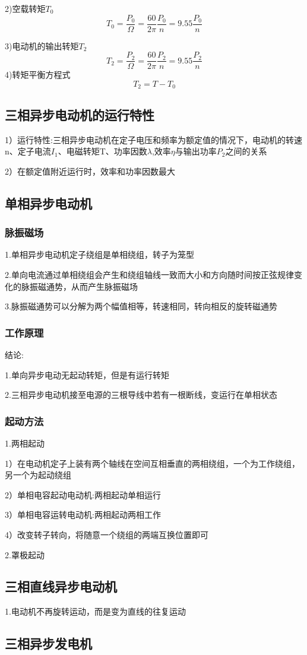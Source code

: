 \documentclass[11pt,twoside,a4paper]{ctexart}
\begin{document}
2)空载转矩$T_0$
\[T_0 = \frac{P_0}{\Omega } = \frac{60}{2\pi }\frac{P_0}{n} = 9.55\frac{P_0}{n}\]

3)电动机的输出转矩$T_2$
\[T_2 = \frac{P_2}{\Omega} = \frac{60}{2\pi}\frac{P_2}{n} = 9.55\frac{P_2}{n}\]
4)转矩平衡方程式
\[T_2 = T - T_0\]

\subsection{三相异步电动机的运行特性}
1）运行特性:三相异步电动机在定子电压和频率为额定值的情况下，电动机的转速n、定子电流$I_1$、电磁转矩T、功率因数$\lambda $,效率$\eta $与输出功率$P_2$之间的关系

2）在额定值附近运行时，效率和功率因数最大

\subsection{单相异步电动机}

\subsubsection{脉振磁场}

1.单相异步电动机定子绕组是单相绕组，转子为笼型

2.单向电流通过单相绕组会产生和绕组轴线一致而大小和方向随时间按正弦规律变化的脉振磁通势，从而产生脉振磁场

3.脉振磁通势可以分解为两个幅值相等，转速相同，转向相反的旋转磁通势

\subsubsection{工作原理}

结论:

1.单向异步电动无起动转矩，但是有运行转矩

2.三相异步电动机接至电源的三根导线中若有一根断线，变运行在单相状态

\subsubsection{起动方法}

1.两相起动

1）在电动机定子上装有两个轴线在空间互相垂直的两相绕组，一个为工作绕组，另一个为起动绕组

2）单相电容起动电动机:两相起动单相运行

3）单相电容运转电动机:两相起动两相工作

4）改变转子转向，将随意一个绕组的两端互换位置即可

2.罩极起动

\subsection{三相直线异步电动机}

1.电动机不再旋转运动，而是变为直线的往复运动

\subsection{三相异步发电机}
\end{document}
